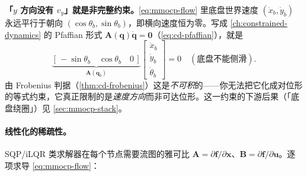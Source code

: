 \begin{insight}
\textbf{「$y$ 方向没有 $v_y$」就是非完整约束。}\;\cref{eq:mmocp-flow} 里底盘世界速度 $(\dot x_b,\dot y_b)$ 永远平行于朝向 $(\cos\theta_b,\sin\theta_b)$，即横向速度恒为零。写成 \cref{ch:constrained-dynamics} 的 Pfaffian 形式 $\mathbf A(\mathbf q)\dot{\mathbf q}=\mathbf 0$（\cref{eq:cd-pfaffian}），就是
\begin{equation}
  \underbrace{[\,-\sin\theta_b\quad \cos\theta_b\quad 0\,]}_{\mathbf A(\mathbf q_b)}
  \begin{bmatrix}\dot x_b\\ \dot y_b\\ \dot\theta_b\end{bmatrix}=0
  \quad(\text{底盘不能侧滑}).
  \label{eq:mmocp-pfaffian}
\end{equation}
由 Frobenius 判据（\cref{thm:cd-frobenius}）这是\emph{不可积}的——你无法把它化成对位形的等式约束，它真正限制的是\emph{速度方向}而非可达位形。这一约束的下游后果（「底盘绕圈」）见 \cref{sec:mmocp-stack}。
\end{insight}

\paragraph{线性化的稀疏性。}
SQP/iLQR 类求解器在每个节点需要流图的雅可比 $\mathbf A=\partial\mathbf f/\partial\mathbf x$、$\mathbf B=\partial\mathbf f/\partial\mathbf u$。逐项求导 \cref{eq:mmocp-flow}：

